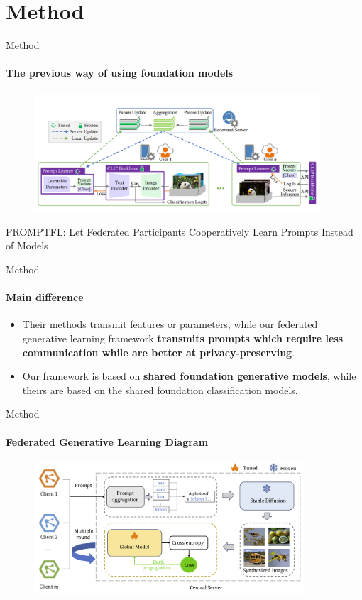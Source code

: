 \documentclass{beamer}
\begin{document}
\section{Method}

\begin{frame}{Method}
\framesubtitle{The previous way of using foundation models}
\begin{figure}
			\centering
			\includegraphics[width=0.95\textwidth]
			{assets/promptfl}
	\end{figure}
	PROMPTFL: Let Federated Participants Cooperatively Learn Prompts Instead of Models
\end{frame}

\begin{frame}{Method}
\framesubtitle{Main difference}
	\begin{itemize}
		\item Their methods transmit features or parameters, while our federated generative learning framework \textbf{transmits prompts which require less communication while are better at privacy-preserving}.
		\item Our framework is based on\textbf{ shared foundation generative models}, while theirs are based on the shared foundation classification models.
	\end{itemize}
\end{frame}

\begin{frame}{Method}
\framesubtitle{Federated Generative Learning Diagram}
\begin{figure}
			\centering
			\includegraphics[width=0.9\textwidth]
			{assets/diagram}
		\end{figure}
\end{frame}
\end{document}

